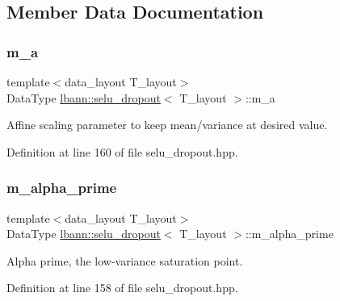 \subsection{Member Data Documentation}
\mbox{\label{classlbann_1_1selu__dropout_a52bd21583da68ba4e8a374fab259a3ef}} 
\subsubsection{\texorpdfstring{m\+\_\+a}{m\_a}}
{\footnotesize\ttfamily template$<$data\+\_\+layout T\+\_\+layout$>$ \\
Data\+Type \hyperlink{classlbann_1_1selu__dropout}{lbann\+::selu\+\_\+dropout}$<$ T\+\_\+layout $>$\+::m\+\_\+a\hspace{0.3cm}{\ttfamily [private]}}

Affine scaling parameter to keep mean/variance at desired value. 

Definition at line 160 of file selu\+\_\+dropout.\+hpp.

\mbox{\label{classlbann_1_1selu__dropout_a8db065b13d8737e1bd4cf154ab3fe666}} 
\subsubsection{\texorpdfstring{m\+\_\+alpha\+\_\+prime}{m\_alpha\_prime}}
{\footnotesize\ttfamily template$<$data\+\_\+layout T\+\_\+layout$>$ \\
Data\+Type \hyperlink{classlbann_1_1selu__dropout}{lbann\+::selu\+\_\+dropout}$<$ T\+\_\+layout $>$\+::m\+\_\+alpha\+\_\+prime\hspace{0.3cm}{\ttfamily [private]}}

Alpha prime, the low-\/variance saturation point. 

Definition at line 158 of file selu\+\_\+dropout.\+hpp.

\mbox{\label{classlbann_1_1selu__dropout_a456fa501b7df6b52701c1aa3639ebc42}} 

